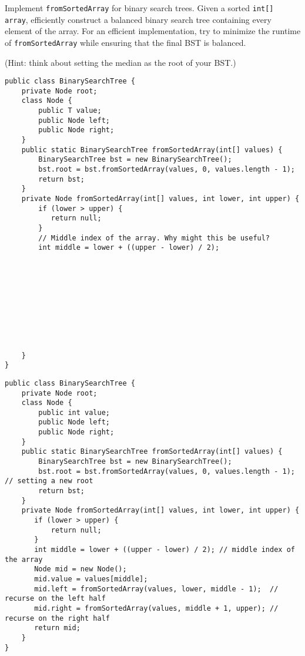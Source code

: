 \begin{blocksection}
\question Implement \lstinline$fromSortedArray$ for binary search trees. Given a sorted \lstinline$int[] array$, efficiently construct a balanced binary search tree containing every element of the array. For an efficient implementation,
try to minimize the runtime of \lstinline$fromSortedArray$ while ensuring
that the final BST is balanced.

(Hint: think about setting the median as the root of your BST.)
\ifprintanswers
\else
\begin{lstlisting}
public class BinarySearchTree {
    private Node root;
    class Node {
        public T value;
        public Node left;
        public Node right;
    }
    public static BinarySearchTree fromSortedArray(int[] values) {
        BinarySearchTree bst = new BinarySearchTree();
        bst.root = bst.fromSortedArray(values, 0, values.length - 1);
        return bst;
    }
    private Node fromSortedArray(int[] values, int lower, int upper) {
        if (lower > upper) {
           return null;
        }
        // Middle index of the array. Why might this be useful?
        int middle = lower + ((upper - lower) / 2);










    }
}
\end{lstlisting}
\fi

\begin{solution}
\begin{lstlisting}
public class BinarySearchTree {
    private Node root;
    class Node {
        public int value;
        public Node left;
        public Node right;
    }
    public static BinarySearchTree fromSortedArray(int[] values) {
        BinarySearchTree bst = new BinarySearchTree();
        bst.root = bst.fromSortedArray(values, 0, values.length - 1); // setting a new root
        return bst;
    }
    private Node fromSortedArray(int[] values, int lower, int upper) {
       if (lower > upper) {
           return null;
       }
       int middle = lower + ((upper - lower) / 2); // middle index of the array
       Node mid = new Node();
       mid.value = values[middle];
       mid.left = fromSortedArray(values, lower, middle - 1);  // recurse on the left half
       mid.right = fromSortedArray(values, middle + 1, upper); // recurse on the right half
       return mid;
    }
}
\end{lstlisting}


\end{solution}
\end{blocksection}
